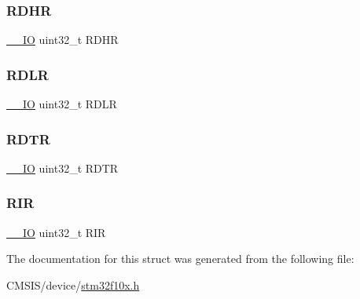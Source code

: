 \subsubsection{\texorpdfstring{RDHR}{RDHR}}
{\footnotesize\ttfamily \mbox{\hyperlink{core__sc300_8h_aec43007d9998a0a0e01faede4133d6be}{\+\_\+\+\_\+\+IO}} uint32\+\_\+t R\+D\+HR}

\mbox{\label{struct_c_a_n___f_i_f_o_mail_box___type_def_ae1c569688eedd49219cd505b9c22121b}} 
\subsubsection{\texorpdfstring{RDLR}{RDLR}}
{\footnotesize\ttfamily \mbox{\hyperlink{core__sc300_8h_aec43007d9998a0a0e01faede4133d6be}{\+\_\+\+\_\+\+IO}} uint32\+\_\+t R\+D\+LR}

\mbox{\label{struct_c_a_n___f_i_f_o_mail_box___type_def_a9563d8a88d0db403b8357331bea83a2e}} 
\subsubsection{\texorpdfstring{RDTR}{RDTR}}
{\footnotesize\ttfamily \mbox{\hyperlink{core__sc300_8h_aec43007d9998a0a0e01faede4133d6be}{\+\_\+\+\_\+\+IO}} uint32\+\_\+t R\+D\+TR}

\mbox{\label{struct_c_a_n___f_i_f_o_mail_box___type_def_a0acc8eb90b17bef5b9e03c7ddaacfb0b}} 
\subsubsection{\texorpdfstring{RIR}{RIR}}
{\footnotesize\ttfamily \mbox{\hyperlink{core__sc300_8h_aec43007d9998a0a0e01faede4133d6be}{\+\_\+\+\_\+\+IO}} uint32\+\_\+t R\+IR}



The documentation for this struct was generated from the following file\+:\begin{DoxyCompactItemize}
\item 
C\+M\+S\+I\+S/device/\mbox{\hyperlink{stm32f10x_8h}{stm32f10x.\+h}}\end{DoxyCompactItemize}
